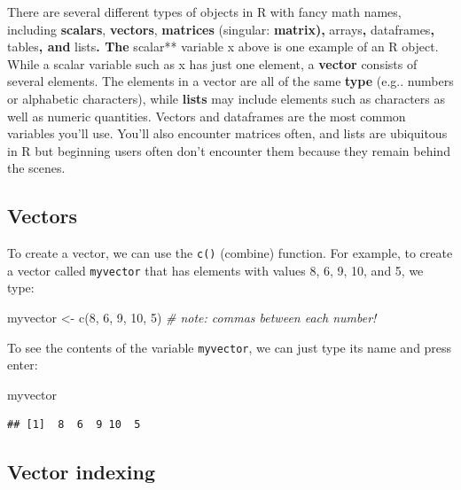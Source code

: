 \documentclass[
]{book}
\newenvironment{Shaded}{\begin{snugshade}}{\end{snugshade}}
\newcommand{\CommentTok}[1]{\textcolor[rgb]{0.56,0.35,0.01}{\textit{#1}}}
\newcommand{\DecValTok}[1]{\textcolor[rgb]{0.00,0.00,0.81}{#1}}
\newcommand{\FunctionTok}[1]{\textcolor[rgb]{0.00,0.00,0.00}{#1}}
\newcommand{\NormalTok}[1]{#1}
\newcommand{\OtherTok}[1]{\textcolor[rgb]{0.56,0.35,0.01}{#1}}
\begin{document}
There are several different types of objects in R with fancy math names, including \textbf{scalars}, \textbf{vectors}, \textbf{matrices} (singular: \textbf{matrix), }arrays\textbf{, }dataframes\textbf{, }tables\textbf{, and }lists\textbf{. The }scalar** variable x above is one example of an R object. While a scalar variable such as x has just one element, a \textbf{vector} consists of several elements. The elements in a vector are all of the same \textbf{type} (e.g.. numbers or alphabetic characters), while \textbf{lists} may include elements such as characters as well as numeric quantities. Vectors and dataframes are the most common variables you'll use. You'll also encounter matrices often, and lists are ubiquitous in R but beginning users often don't encounter them because they remain behind the scenes.

\hypertarget{vectors}{%
\subsection{Vectors}\label{vectors}}

To create a vector, we can use the \texttt{c()} (combine) function. For example, to create a vector called \texttt{myvector} that has elements with values 8, 6, 9, 10, and 5, we type:

\begin{Shaded}
\begin{Highlighting}[]
\NormalTok{myvector }\OtherTok{\textless{}{-}} \FunctionTok{c}\NormalTok{(}\DecValTok{8}\NormalTok{, }\DecValTok{6}\NormalTok{, }\DecValTok{9}\NormalTok{, }\DecValTok{10}\NormalTok{, }\DecValTok{5}\NormalTok{) }\CommentTok{\# note: commas between each number!}
\end{Highlighting}
\end{Shaded}

To see the contents of the variable \texttt{myvector}, we can just type its name and press enter:

\begin{Shaded}
\begin{Highlighting}[]
\NormalTok{myvector}
\end{Highlighting}
\end{Shaded}

\begin{verbatim}
## [1]  8  6  9 10  5
\end{verbatim}

\hypertarget{vector-indexing}{%
\subsection{Vector indexing}\label{vector-indexing}}
\end{document}
